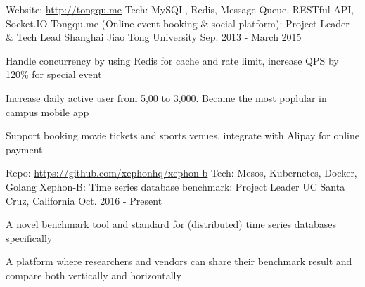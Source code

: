 

\begin{cventries}

  \cventry
    {Website: \url{http://tongqu.me} Tech: MySQL, Redis, Message Queue, RESTful API, Socket.IO} %
    {Tongqu.me (Online event booking \& social platform): Project Leader \& Tech Lead} %
    {Shanghai Jiao Tong University} %
    {Sep. 2013 - March 2015} %
    {
      \begin{cvitems} %
        \item {Handle concurrency by using Redis for cache and rate limit, increase QPS by 120\% for special event}
        \item {Increase daily active user from 5,00 to 3,000. Became the most poplular in campus mobile app}
        \item {Support booking movie tickets and sports venues, integrate with Alipay for online payment}
      \end{cvitems}
    }

  \cventry
    {Repo: \url{https://github.com/xephonhq/xephon-b} Tech: Mesos, Kubernetes, Docker, Golang } %
    {Xephon-B: Time series database benchmark: Project Leader} %
    {UC Santa Cruz, California} %
    {Oct. 2016 - Present} %
    {
      \begin{cvitems} %
        \item {A novel benchmark tool and standard for (distributed) time series databases specifically}
        \item {A platform where researchers and vendors can share their benchmark result and compare both vertically and horizontally}
      \end{cvitems}
    }


\end{cventries}
